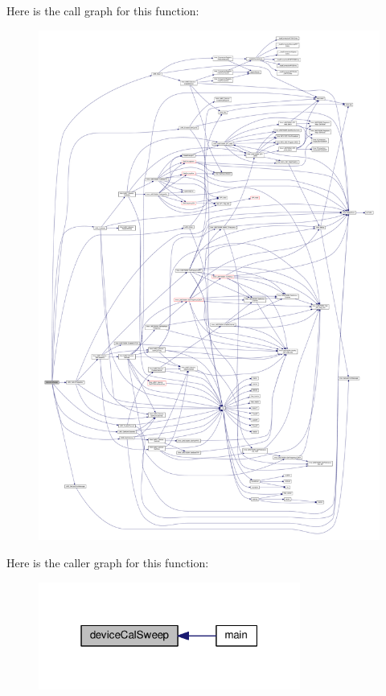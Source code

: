 Here is the call graph for this function\+:
\nopagebreak
\begin{figure}[H]
\begin{center}
\leavevmode
\includegraphics[width=350pt]{d5/db6/LimeUtil_8cpp_a414129fca3ea0b9b0cc5a510c019695b_cgraph}
\end{center}
\end{figure}




Here is the caller graph for this function\+:
\nopagebreak
\begin{figure}[H]
\begin{center}
\leavevmode
\includegraphics[width=244pt]{d5/db6/LimeUtil_8cpp_a414129fca3ea0b9b0cc5a510c019695b_icgraph}
\end{center}
\end{figure}


